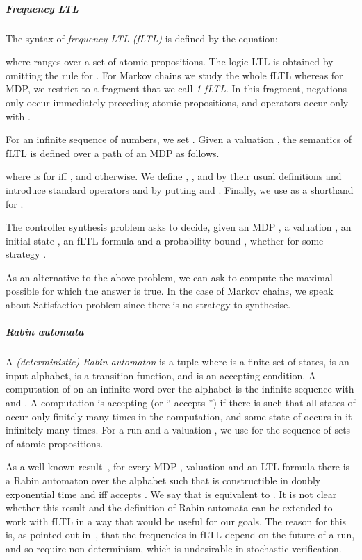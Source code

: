 \documentclass[a4paper,UKenglish]{lipics}
\begin{document}
\subparagraph{Frequency LTL}
The syntax of {\em frequency LTL (fLTL)} is defined by the equation:

where  ranges over a set  of atomic propositions. The logic LTL is obtained by omitting the rule for
.
For Markov chains we study the whole fLTL whereas for MDP, we restrict to a fragment that we call \emph{1-fLTL}. In this fragment, negations only occur immediately preceding atomic propositions, and  operators occur only with .

For an infinite sequence
 of numbers, we set .
Given a valuation , the semantics of fLTL is defined over a path  of an MDP as follows.

where  is  for  iff , and  otherwise.
We define , , and  by their usual definitions and introduce standard operators
 and  by putting  and
. 
Finally, we use  as a shorthand for .

\begin{definition}
	The controller synthesis problem asks to decide, given an MDP , a valuation , an initial state , an fLTL formula  and
	a probability bound , whether
	 for some strategy .
\end{definition}

As an alternative to the above problem, we can ask to compute the maximal possible  for which the answer is true.
In the case of Markov chains, we speak about {\sf Satisfaction} problem since there is no strategy to synthesise.


\subparagraph{Rabin automata}
A {\em (deterministic) Rabin automaton} is a tuple  where 
is a finite set of states,  is an input alphabet, 
is a transition function, and  is an accepting condition.
A computation of  on an infinite word  over the alphabet  is the
infinite sequence  with  and . A computation
is accepting (or `` accepts '')
if there is  such that all states of  occur only
finitely many times in the computation, and some state of  occurs in it infinitely many times.
For a run  and a valuation , we use  for the sequence 
of sets of atomic propositions.

As a well known result~\cite{BP08}, 
for every MDP , valuation  and an LTL formula  there is a Rabin automaton  over the alphabet  such that  is constructible in doubly exponential time and  iff 
accepts . We say that  is equivalent to .
It is not clear whether this result and the definition of Rabin automata can be extended to work with fLTL in a way
that would be useful for our goals. The reason for this is, as pointed out in~\cite[Section 4, Footnote 4]{AT12}, that the frequencies in fLTL depend on the future of a run, and so require non-determinism, which is undesirable in stochastic verification.
\end{document}
